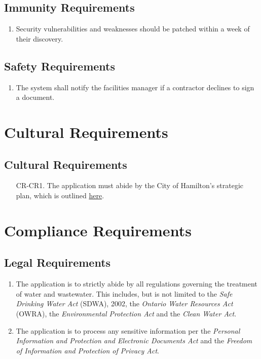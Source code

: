 \documentclass[12pt]{article}
\begin{document}
\subsection{Immunity Requirements}
\begin{enumerate} [{SR-IMR}1.]
  \item Security vulnerabilities and weaknesses should be patched
    within a week of their discovery.
\end{enumerate}
\subsection{Safety Requirements}
\begin{enumerate}[{SR-S}1.]
  \item The system shall notify the facilities manager if a contractor declines
    to sign a document.
\end{enumerate}

\section{Cultural Requirements}
\subsection{Cultural Requirements}
\begin{enumerate}[{CR-CR}1.]
  \item[CR-CR1.] The application must abide by the City of Hamilton's
    strategic plan, which is outlined
    \href{https://www.hamilton.ca/city-council/plans-strategies/strategies/2016-2025-strategic-plan}{here}.
\end{enumerate}

\section{Compliance Requirements}
\subsection{Legal Requirements}
\begin{enumerate}[{CR-L}1.]
  \item The application is to strictly abide by all regulations governing
    the treatment of water and wastewater. This includes, but is not limited
    to the \textit{Safe Drinking Water Act} (SDWA), 2002, the
    \textit{Ontario Water Resources Act} (OWRA), the
    \textit{Environmental Protection Act} and the \textit{Clean Water Act}.\\
  \item The application is to process any sensitive information per the
    \textit{Personal Information and Protection and Electronic
    Documents Act} and
    the \textit{Freedom of Information and Protection of Privacy Act}.
\end{enumerate}
\end{document}
